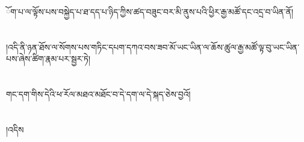 ོག་པ་ལ་ལྟོས་པས་བསྐྱེད་པ་ཐ་དད་པ་ཉིད་ཀྱིས་ཚད་བཟུང་བར་མི་ནུས་པའི་ཕྱིར་རྒྱ་མཚོ་དང་འདྲ་བ་ཡིན་ནོ།\chapter{ }།འདི་ནི་ཉན་ཐོས་ལ་སོགས་པས་གཏིང་དཔག་དཀའ་བས་ཟབ་མོ་ཡང་ཡིན་ལ་ཆོས་ཚུལ་རྒྱ་མཚོ་ལྟ་བུ་ཡང་ཡིན་པས་ཞེས་ཚིག་རྣམ་པར་སྦྱར་ཏེ།\chapter{ }གང་དག་གིས་དེའི་ཕ་རོལ་མཐའ་མཐོང་བ་དེ་དག་ལ་དེ་སྐད་ཅེས་བྱའོ།\chapter{ }།འདིས